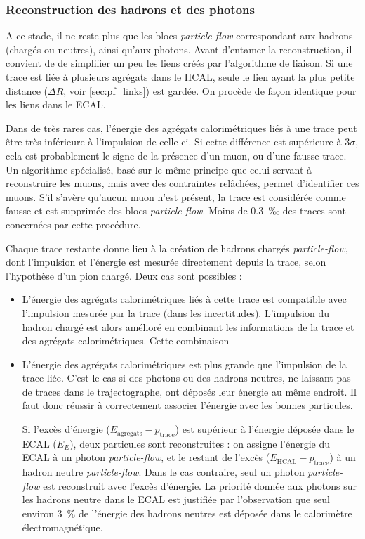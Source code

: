 \subsubsection{Reconstruction des hadrons et des photons}

A ce stade, il ne reste plus que les blocs \emph{particle-flow} correspondant aux hadrons (chargés ou neutres), ainsi qu'aux photons. Avant d'entamer la reconstruction, il convient de de simplifier un peu les liens créés par l'algorithme de liaison. Si une trace est liée à plusieurs agrégats dans le HCAL, seule le lien ayant la plus petite distance ($\Delta R$, voir \cref{sec:pf_links}) est gardée. On procède de façon identique pour les liens dans le ECAL.

Dans de très rares cas, l'énergie des agrégats calorimétriques liés à une trace peut être très inférieure à l'impulsion de celle-ci. Si cette différence est supérieure à $3\sigma$, cela est probablement le signe de la présence d'un muon, ou d'une fausse trace. Un algorithme spécialisé, basé sur le même principe que celui servant à reconstruire les muons, mais avec des contraintes relâchées, permet d'identifier ces muons. S'il s'avère qu'aucun muon n'est présent, la trace est considérée comme fausse et est supprimée des blocs \emph{particle-flow}. Moins de \SI{0.3}{‰} des traces sont concernées par cette procédure.

Chaque trace restante donne lieu à la création de hadrons chargés \emph{particle-flow}, dont l'impulsion et l'énergie est mesurée directement depuis la trace, selon l'hypothèse d'un pion chargé. Deux cas sont possibles :
\begin{itemize}
    \item L'énergie des agrégats calorimétriques liés à cette trace est compatible avec l'impulsion mesurée par la trace (dans les incertitudes). L'impulsion du hadron chargé est alors amélioré en combinant les informations de la trace et des agrégats calorimétriques. Cette combinaison 
    \item L'énergie des agrégats calorimétriques est plus grande que l'impulsion de la trace liée. C'est le cas si des photons ou des hadrons neutres, ne laissant pas de traces dans le trajectographe, ont déposés leur énergie au même endroit. Il faut donc réussir à correctement associer l'énergie avec les bonnes particules.

    \smallskip

    Si l'excès d'énergie ($E_\text{agrégats} - p_\text{trace}$) est supérieur à l'énergie déposée dans le ECAL ($E_E$), deux particules sont reconstruites : on assigne l'énergie du ECAL à un photon \emph{particle-flow}, et le restant de l'excès ($E_\text{HCAL} - p_\text{trace}$) à un hadron neutre \emph{particle-flow}. Dans le cas contraire, seul un photon \emph{particle-flow} est reconstruit avec l'excès d'énergie. La priorité donnée aux photons sur les hadrons neutre dans le ECAL est justifiée par l'observation que seul environ \SI{3}{\%} de l'énergie des hadrons neutres est déposée dans le calorimètre électromagnétique.
\end{itemize}

